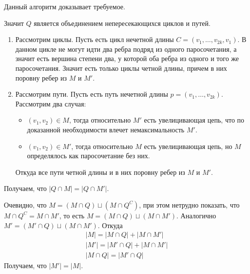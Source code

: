 \begin{itemize}
    Данный алгоритм доказывает требуемое.\Endproof
    
    Значит $Q$ является объединением непересекающихся циклов и путей.
    \begin{enumerate}
        \item Рассмотрим циклы. Пусть есть цикл нечетной длины $C = (v_1, \ldots, v_{2k}, v_1)$. В данном цикле не могут идти два ребра подряд из одного паросочетания, а значит есть вершина степени два, у которой оба ребра из одного и того же паросочетания. Значит есть только циклы четной длины, причем в них поровну ребер из $M$ и $M'$.
        \item Рассмотрим пути. Пусть есть путь нечетной длины $p = (v_1, \ldots, v_{2k})$. Рассмотрим два случая:
        \begin{itemize}
            \item $(v_1, v_2) \in M$, тогда относительно $M'$ есть увелицивающая цепь, что по доказанной необходимости влечет немаксимальность $M'$.
            \item $(v_1, v_2) \in M'$, тогда относительно $M$ есть увелицивающая цепь, но $M$ определялось как паросочетание без них.
        \end{itemize}
        Откуда все пути четной длины и в них поровну ребер из $M$ и $M'$.
    \end{enumerate}
    Получаем, что $|Q \cap M| = |Q \cap M'|$. 
    
    Очевидно, что $M = (M \cap Q) \sqcup (M \cap Q^C)$, при этом нетрудно показать, что $M \cap Q^C = M \cap M'$, то есть $M = (M \cap Q) \sqcup (M \cap M')$. Аналогично $M' = (M' \cap Q) \sqcup (M \cap M')$. Откуда
    \begin{gather*}
        |M| = |M \cap Q| + |M \cap M'| \\
        |M'| = |M' \cap Q| + |M \cap M'| \\
        |M \cap Q| = |M' \cap Q|
    \end{gather*}
    Получаем, что $|M'| = |M|$. 
\end{itemize}\Endproof